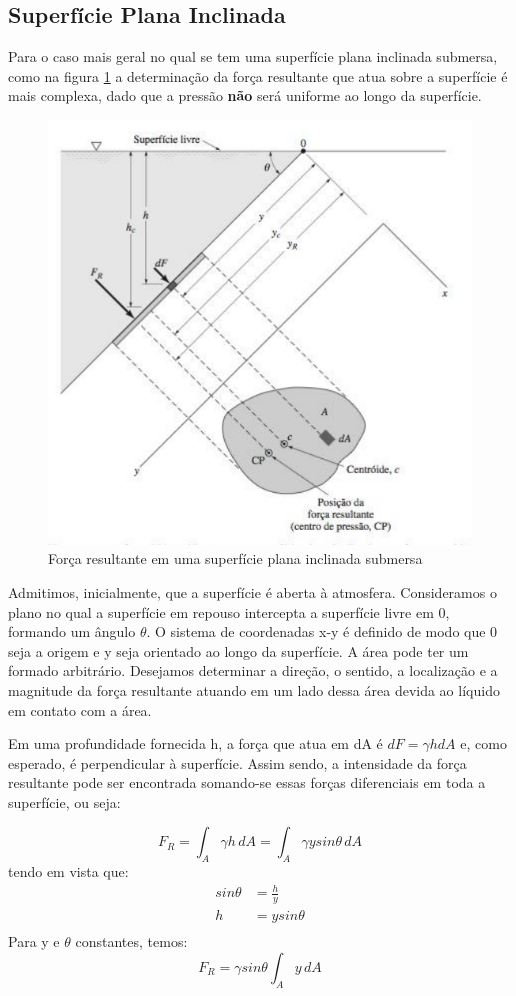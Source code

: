 \documentclass{article}
\begin{document}
\subsection{Superfície Plana Inclinada}
Para o caso mais geral no qual se tem uma superfície plana inclinada submersa, como na figura \ref{fig:forcaResultanteSuperficieInclinada} a determinação da força resultante que atua sobre a superfície é mais complexa, dado que a pressão \textbf{não} será uniforme ao longo da superfície.
\begin{figure}[!h]
  \centering
  \includegraphics[width=0.6\linewidth]{forcaResultanteSuperficieInclinada.png}
  \caption{Força resultante em uma superfície plana inclinada submersa}
  \label{fig:forcaResultanteSuperficieInclinada}
\end{figure}

Admitimos, inicialmente, que a superfície é aberta à atmosfera. Consideramos o plano no qual a superfície em repouso intercepta a superfície livre em 0, formando um ângulo $\theta$. O sistema de coordenadas x-y é definido de modo que 0 seja a origem e y seja orientado ao longo da superfície. A área pode ter um formado arbitrário. Desejamos determinar a direção, o sentido, a localização e a magnitude da força resultante atuando em um lado dessa área devida ao líquido em contato com a área.

Em uma profundidade fornecida h, a força que atua em dA é $dF = \gamma h dA$ e, como esperado, é perpendicular à superfície. Assim sendo, a intensidade da força resultante pode ser encontrada somando-se essas forças diferenciais em toda a superfície, ou seja:

\begin{equation}
  F_R = \int_{A}^{ } \gamma h\, dA = \int_{A}^{ } \gamma y sin\theta\, dA
  \label{eq:integrandoForcaSuperficieInclinada}
\end{equation}
tendo em vista que:
\begin{align}
  sin\theta &= \frac{h}{y}\\
  h &= y sin\theta \\
  \label{eq:formulaProfundidadeAreaSuperficieInclinada}
\end{align}
Para y e $\theta$ constantes, temos:
\begin{equation}
  F_R=\gamma sin \theta \int_{A}^{ } y\, dA
  \label{eq:forcaResultanteSuperficieInclinada2}
\end{equation}
\end{document}

